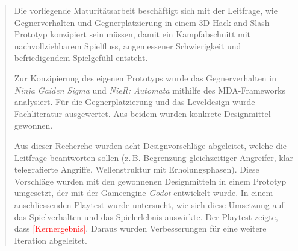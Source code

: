 \documentclass[10pt]{article}
\newcommand{\game}[1]{\textit{#1}}   %
\begin{document}
\begin{abstract}
    Die vorliegende Maturitätsarbeit beschäftigt sich mit der Leitfrage, wie Gegnerverhalten und Gegnerplatzierung in einem 3D-Hack-and-Slash-Prototyp konzipiert sein müssen, damit ein Kampfabschnitt mit nachvollziehbarem Spielfluss, angemessener Schwierigkeit und befriedigendem Spielgefühl entsteht.

    Zur Konzipierung des eigenen Prototyps wurde das Gegnerverhalten in \textit{Ninja Gaiden Sigma} und \textit{NieR: Automata} mithilfe des MDA-Frameworks analysiert. Für die Gegnerplatzierung und das Leveldesign wurde Fachliteratur ausgewertet. Aus beidem wurden konkrete Designmittel gewonnen.

    Aus dieser Recherche wurden acht Designvorschläge abgeleitet, welche die Leitfrage beantworten sollen (z.\,B. Begrenzung gleichzeitiger Angreifer, klar telegrafierte Angriffe, Wellenstruktur mit Erholungsphasen). Diese Vorschläge wurden mit den gewonnenen Designmitteln in einem Prototyp umgesetzt, der mit der Gameengine \game{Godot} entwickelt wurde. In einem anschliessenden Playtest wurde untersucht, wie sich diese Umsetzung auf das Spielverhalten und das Spielerlebnis auswirkte. Der Playtest zeigte, dass \textcolor{red}{[Kernergebnis]}. Daraus wurden Verbesserungen für eine weitere Iteration abgeleitet.
\end{abstract}

\newpage


\tableofcontents

\newpage



\newpage


\newpage


\newpage


\newpage


\newpage


\newpage


\newpage


\newpage


\newpage
\end{document}
